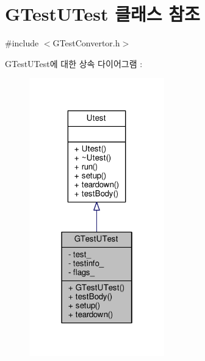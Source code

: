 \hypertarget{class_g_test_u_test}{}\section{G\+Test\+U\+Test 클래스 참조}
\label{class_g_test_u_test}


{\ttfamily \#include $<$G\+Test\+Convertor.\+h$>$}



G\+Test\+U\+Test에 대한 상속 다이어그램 \+: 
\nopagebreak
\begin{figure}[H]
\begin{center}
\leavevmode
\includegraphics[width=166pt]{class_g_test_u_test__inherit__graph}
\end{center}
\end{figure}


